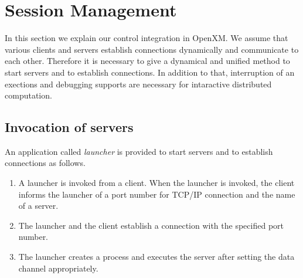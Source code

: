 
\section{Session Management}
\label{secsession}
 
In this section we explain our control integration in
OpenXM.  We assume that various clients and servers
establish connections dynamically and communicate to each
other. Therefore it is necessary to give a dynamical and unified
method to start servers and to establish connections.
In addition to that, interruption of an exections and debugging
supports are necessary for intaractive distributed computation.

%

\subsection{Invocation of servers}
\label{launcher}

An application called {\it launcher} is provided to start servers
and to establish connections as follows.

\begin{enumerate}
\item A launcher is invoked from a client.
When the launcher is invoked, the client 
informs the launcher of a port number for TCP/IP connection
and the name of a server.
\item The launcher and the client establish a connection with the
specified port number.
\item The launcher creates a process and executes the server after
setting the data channel appropriately.
\end{enumerate}

